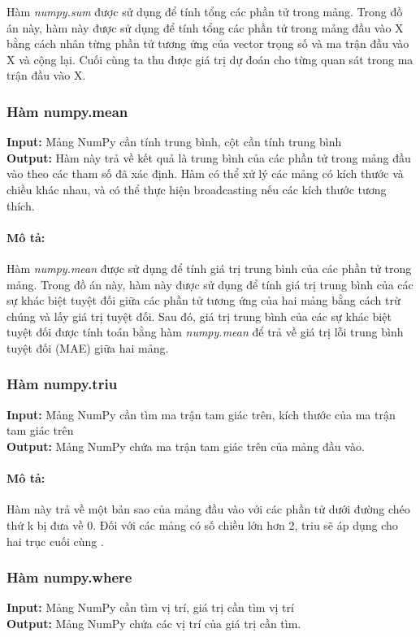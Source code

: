 \documentclass[]{article}
\begin{document}
Hàm \textit{numpy.sum} \cite{numpyNumpysum} được sử dụng để tính tổng các phần tử trong mảng. Trong đồ án này, hàm này được sử dụng để tính tổng các phần tử trong mảng đầu vào X bằng cách nhân từng phần tử tương ứng của vector trọng số và ma trận đầu vào X và cộng lại. Cuối cùng ta thu được giá trị dự đoán cho từng quan sát trong ma trận đầu vào X.

\subsubsection{Hàm numpy.mean}
\noindent
\textbf{Input:} Mảng NumPy cần tính trung bình, cột cần tính trung bình \\
\textbf{Output:} Hàm này trả về kết quả là trung bình của các phần tử trong mảng đầu vào theo các tham số đã xác định. Hàm có thể xử lý các mảng có kích thước và chiều khác nhau, và có thể thực hiện broadcasting nếu các kích thước tương thích.
\paragraph{Mô tả:}
Hàm \textit{numpy.mean} \cite{numpyNumpymean} được sử dụng để tính giá trị trung bình của các phần tử trong mảng. Trong đồ án này, hàm này được sử dụng để tính giá trị trung bình của các sự khác biệt tuyệt đối giữa các phần tử tương ứng của hai mảng bằng cách trừ chúng và lấy giá trị tuyệt đối. Sau đó, giá trị trung bình của các sự khác biệt tuyệt đối được tính toán bằng hàm \textit{numpy.mean} để trả về giá trị lỗi trung bình tuyệt đối (MAE) giữa hai mảng.

\subsubsection{Hàm numpy.triu}
\noindent
\textbf{Input:} Mảng NumPy cần tìm ma trận tam giác trên, kích thước của ma trận tam giác trên \\
\textbf{Output:} Mảng NumPy chứa ma trận tam giác trên của mảng đầu vào.
\paragraph{Mô tả:}
Hàm này trả về một bản sao của mảng đầu vào với các phần tử dưới đường chéo thứ k bị đưa về 0. Đối với các mảng có số chiều lớn hơn 2, triu sẽ áp dụng cho hai trục cuối cùng \cite{numpyNumpytriu}.

\subsubsection{Hàm numpy.where}
\noindent
\textbf{Input:} Mảng NumPy cần tìm vị trí, giá trị cần tìm vị trí \\
\textbf{Output:} Mảng NumPy chứa các vị trí của giá trị cần tìm.
\end{document}
